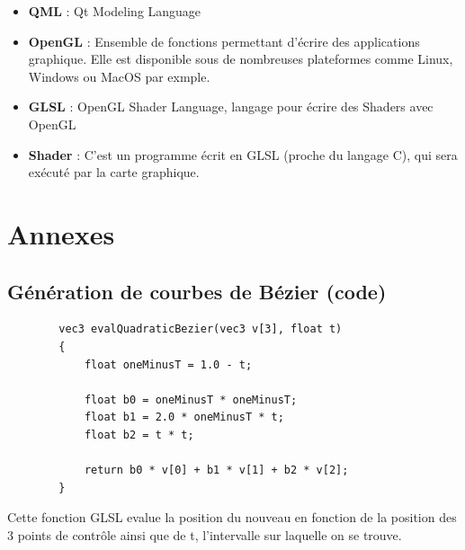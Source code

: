 \documentclass[12pt]{article}
\begin{document}
\begin{itemize}
		\item[]\textbf{QML} : Qt Modeling Language\\
		\item[]\textbf{OpenGL} : Ensemble de fonctions permettant d'écrire des applications graphique.
		Elle est disponible sous de nombreuses plateformes comme Linux, Windows ou MacOS par exmple.
		\item[]\textbf{GLSL} : OpenGL Shader Language, langage pour écrire des Shaders avec OpenGL\\
		\item[]\textbf{Shader} : C'est un programme écrit en GLSL (proche du langage C), qui sera
		exécuté par la carte graphique.\\
	\end{itemize}
	
	\newpage
		
	
	\newpage
	\section{Annexes}
		\subsection{Génération de courbes de Bézier (code)}	\label{code_courbes_bezier}
		
		\begin{lstlisting}
		vec3 evalQuadraticBezier(vec3 v[3], float t)
		{
		    float oneMinusT = 1.0 - t;

		    float b0 = oneMinusT * oneMinusT;
		    float b1 = 2.0 * oneMinusT * t;
		    float b2 = t * t;
		    
		    return b0 * v[0] + b1 * v[1] + b2 * v[2];
		}
		\end{lstlisting}
		
		Cette fonction GLSL evalue la position du nouveau en fonction de la position des 3
		points de contrôle ainsi que de t, l'intervalle sur laquelle on se trouve.\\
		
\end{document}
